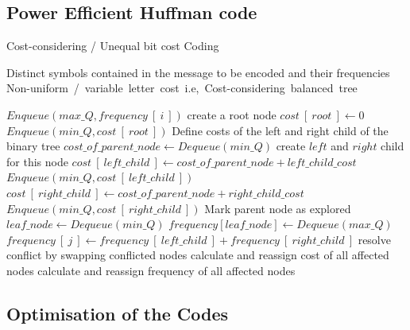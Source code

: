 \documentclass[preprint,12pt]{elsarticle}
\begin{document}
\subsection{Power Efficient Huffman code}
\begin{algorithm}[!btph]
\caption{Cost-considering / Unequal bit cost Coding}
\label{alg1}

\begin{algorithmic}[1]
\REQUIRE Distinct symbols contained in the message to be encoded and their frequencies 
\ENSURE Non-uniform\ /\ variable\ letter\ cost\ i.e,\ Cost-considering\ balanced\ tree

\STATE $ Enqueue\left(max\_Q , frequency~[~i~]\right)$
\ENDFOR
\STATE create a root node
\STATE $cost~[~root~]\leftarrow 0$
\STATE $Enqueue\left(min\_Q , cost~[~root~]\right)$
\STATE Define costs of the left and right child of the binary tree
\REPEAT 
\STATE $cost\_of\_parent\_node\leftarrow Dequeue\left(min\_Q\right)$
\STATE create $left$ and $right$ child for this node
\STATE $cost~[~left\_child~]\leftarrow cost\_of\_parent\_node+left\_child\_cost$
\STATE $Enqueue\left(min\_Q , cost~[~left\_child~]\right)$
\STATE $cost~[~right\_child~]\leftarrow cost\_of\_parent\_node+right\_child\_cost$
\STATE $Enqueue\left(min\_Q , cost~[~right\_child~]\right)$
\STATE Mark parent node as explored
\STATE $leaf\_node\leftarrow Dequeue\left(min\_Q\right)$
\STATE $frequency[leaf\_node]\leftarrow Dequeue\left(max\_Q\right)$
\ENDWHILE
{} 
\STATE $frequency~[~j~]\leftarrow frequency~[~left\_child~]+frequency~[~right\_child~]$
\ENDFOR
\REPEAT
{} 
\STATE resolve conflict by swapping conflicted nodes
\STATE calculate and reassign cost of all affected nodes
\STATE calculate and reassign frequency of all affected nodes 
\ENDIF
{}
\end{algorithmic}
\end{algorithm}
\subsection{Optimisation of the Codes}
\end{document}
